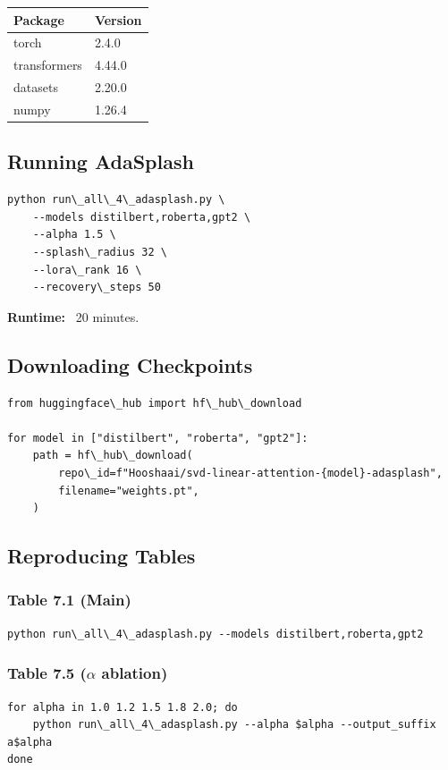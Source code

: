 \begin{table}[H]
\centering
\small
\begin{tabular}{ll}
\toprule
\textbf{Package} & \textbf{Version} \\
\midrule
torch & 2.4.0 \\
transformers & 4.44.0 \\
datasets & 2.20.0 \\
numpy & 1.26.4 \\
\bottomrule
\end{tabular}
\end{table}

\subsection{Running AdaSplash}

\begin{lstlisting}
python run\_all\_4\_adasplash.py \
    --models distilbert,roberta,gpt2 \
    --alpha 1.5 \
    --splash\_radius 32 \
    --lora\_rank 16 \
    --recovery\_steps 50
\end{lstlisting}

\textbf{Runtime:} ~20 minutes.

\subsection{Downloading Checkpoints}

\begin{lstlisting}
from huggingface\_hub import hf\_hub\_download

for model in ["distilbert", "roberta", "gpt2"]:
    path = hf\_hub\_download(
        repo\_id=f"Hooshaai/svd-linear-attention-{model}-adasplash",
        filename="weights.pt",
    )
\end{lstlisting}

\subsection{Reproducing Tables}

\subsubsection{Table 7.1 (Main)}
\begin{lstlisting}
python run\_all\_4\_adasplash.py --models distilbert,roberta,gpt2
\end{lstlisting}

\subsubsection{Table 7.5 ($\alpha$ ablation)}
\begin{lstlisting}
for alpha in 1.0 1.2 1.5 1.8 2.0; do
    python run\_all\_4\_adasplash.py --alpha $alpha --output_suffix a$alpha
done
\end{lstlisting}

